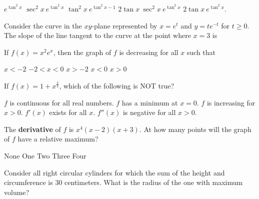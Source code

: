 \begin{questions}
    \begin{oneparchoices}
    \choice $e^{\tan^2 x}$
    \choice $\sec^2 x\ e^{\tan^2 x}$
    \choice $\tan^2 x\ e^{\tan^2 x - 1}$
    \CorrectChoice $2\tan x\ \sec^2 x\ e^{\tan^2 x}$
    \choice $2\tan x\ e^{\tan^2 x}$.
    \end{oneparchoices}

\question[2] Consider the curve in the $xy$-plane represented by $x =
    e^t$ and $y = te^{-t}$ for $t \ge 0$. The slope of the line
    tangent to the curve at the point where $x = 3$ is

    \begin{oneparchoices}
    \end{oneparchoices}

\question[2] If $f(x) = x^2e^x$, then the graph of $f$ is decreasing
    for all $x$ such that

    \begin{oneparchoices}
    \choice $x < -2$
    \CorrectChoice $-2 < x < 0$
    \choice $x > -2$
    \choice $x < 0$
    \choice $x > 0$
    \end{oneparchoices}

\question[2] If $f(x) = 1 + x^{\frac{2}{3}}$, which of the following
    is NOT true?

    \begin{oneparchoices}
    \choice $f$ is continuous for all real numbers.
    \choice $f$ has a minimum at $x = 0$.
    \choice $f$ is increasing for $x > 0$.
    \CorrectChoice $f'(x)$ exists for all $x$.
    \choice $f''(x)$ is negative for all $x > 0$.
    \end{oneparchoices}

\question[2] The {\bf derivative} of $f$ is $x^4(x - 2)(x + 3)$. At
    how many points will the graph of $f$ have a relative maximum?

    \begin{oneparchoices}
    \choice None
    \CorrectChoice One
    \choice Two
    \choice Three
    \choice Four
    \end{oneparchoices}

\question[2] Consider all right circular cylinders for which the sum
    of the height and circumference is 30 centimeters. What is the
    radius of the one with maximum volume?


\end{questions}
